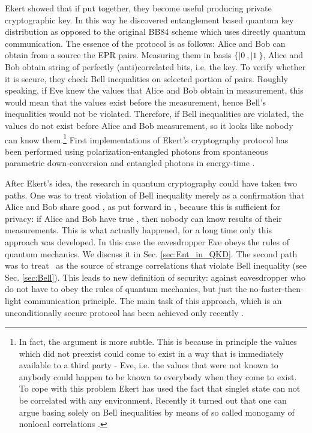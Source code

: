 \documentclass[twocolumn,aps,rmp]{revtex4}
\begin{document}
Ekert showed that if put together, they become useful producing
private cryptographic key. In this way he discovered entanglement
based quantum key distribution as opposed to the original BB84 scheme
which uses directly quantum communication.  The essence of the
protocol is as follows: Alice and Bob can obtain from a source the EPR
pairs.  Measuring them in basis $\{|0\>,|1\>\}$, Alice and Bob obtain
string of perfectly (anti)correlated bits, i.e. the key. To verify
whether it is secure, they check Bell inequalities on selected portion
of pairs.  Roughly speaking, if Eve knew the values that Alice and Bob
obtain in measurement, this would mean that the values exist before
the measurement, hence Bell's inequalities would not be
violated. Therefore, if Bell inequalities are violated, the values do
not exist before Alice and Bob measurement, so it looks like nobody
can know them.\footnote{ In fact, the argument is more subtle. This is
  because in principle the values which did not preexist could come to
  exist in a way that is immediately available to a third party - Eve,
  i.e. the values that were not known to anybody could happen to be
  known to everybody when they come to exist.  To cope with this
  problem Ekert has used the fact that singlet state can not be
  correlated with any environment. Recently it turned out that one can
  argue basing solely on Bell inequalities by means of so called
  monogamy of nonlocal correlations
  \cite{AcinGM-bellqkd,BKP_Bellcrypto,BHK_Bell_key,MW_Bellcrypto}.}
  First implementations of Ekert's cryptography protocol has been performed
  using polarization-entangled photons from spontaneous parametric down-conversion \cite {NaikPWBK} and entangled photons in energy-time \cite {TittelBZG}.


After Ekert's idea, the research in quantum cryptography could have
taken two paths. One was to treat violation of Bell inequality merely
as a confirmation that Alice and Bob share good \eprstates, as put
forward in \cite{BBM92}, because this is sufficient for privacy: if
Alice and Bob have true \eprstate, then nobody can know results of
their measurements. This is what actually happened, for a long time
only this approach was developed. In this case the eavesdropper Eve
obeys the rules of quantum mechanics. We discuss it in
Sec. \ref{sec:Ent_in_QKD}.  The second path was to treat \eprstate\ as
the source of strange correlations that violate Bell inequality (see
Sec. \ref{sec:Bell}). This leads to new definition of security:
against eavesdropper who do not have to obey the rules of quantum
mechanics, but just the no-faster-then-light communication
principle. The main task of this approach, which is an unconditionally
secure protocol has been achieved only recently
\cite{Nonsig_theories,BHK_Bell_key,MW_Bellcrypto}.
\end{document}
